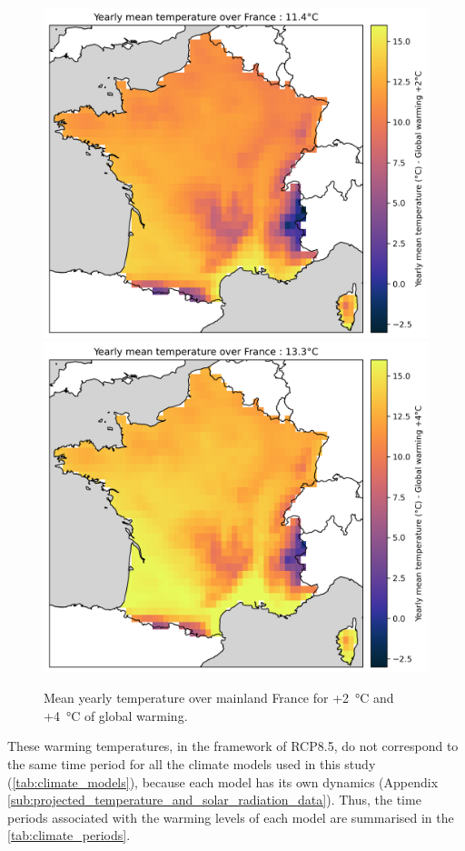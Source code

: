 \documentclass[11pt]{article}
\begin{document}
        \begin{figure}[ht]
            \centering
            \includegraphics[width=0.49\columnwidth]{figures/mean_yearly_temperature_france_gw2deg.png}
            \includegraphics[width=0.49\columnwidth]{figures/mean_yearly_temperature_france_gw4deg.png}
            \caption{\label{fig:gw24} Mean yearly temperature over mainland France for +\SI{2}{\celsius} and +\SI{4}{\celsius} of global warming.}
        \end{figure}

        These warming temperatures, in the framework of RCP8.5, do not correspond to the same time period for all the climate models used in this study (\ref{tab:climate_models}), because each model has its own dynamics (Appendix \ref{sub:projected_temperature_and_solar_radiation_data}). Thus, the time periods associated with the warming levels of each model are summarised in the \ref{tab:climate_periods}. 
\end{document}
